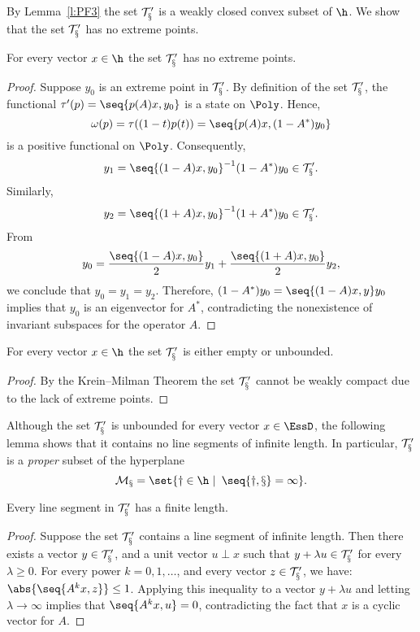 \medskip

By Lemma~\ref{l:PF3} the set $\cal{T}'_x$ is a weakly closed
convex subset of $\h$. We show that the set $\cal{T}'_x$ has no
extreme points.

\smallskip

\begin{lem} \label{l:EXTR}
For every vector $x\in\h$ the set $\cal{T}'_x$ has no extreme
points.
\end{lem}

\begin{proof}
Suppose $y_0$ is an extreme point in $\cal{T}'_x$. By
definition of the set $\cal{T}'_x$, the functional
$\tau'(p)=\seq{p(A)x,y_0}$ is a state on $\Poly$. Hence,
\[ \omega(p)=\tau((1-t)p(t))=\seq{p(A)x, (1-A^*)y_0} \]
is a positive functional on $\Poly$. Consequently,
\[ y_1 = \seq{(1-A)x, y_0}^{-1}(1-A^*)y_0 \in \cal{T}'_x. \]
Similarly,
\[ y_2 = \seq{(1+A)x, y_0}^{-1}(1+A^*)y_0 \in \cal{T}'_x. \]
From
\[ y_0 = \frac{\seq{(1-A)x, y_0}}{2} y_1 +
         \frac{\seq{(1+A)x, y_0}}{2} y_2, \]
we conclude that $y_0=y_1=y_2$. Therefore,
$(1-A^*)y_0=\seq{(1-A)x,y}y_0$ implies that $y_0$ is an
eigenvector for $A^*$, contradicting the nonexistence of
invariant subspaces for the operator $A$.
\end{proof}

\begin{cor} \label{c:UNBOUND}
For every vector $x\in\h$ the set $\cal{T}'_x$ is either empty
or unbounded.
\end{cor}

\begin{proof}
By the Krein--Milman Theorem the set $\cal{T}'_x$ cannot be
weakly compact due to the lack of extreme points.
\end{proof}

\medskip

Although the set $\cal{T}'_x$ is unbounded for every vector
$x\in\EssD$, the following lemma shows that it contains no line
segments of infinite length. In particular, $\cal{T}'_x$ is a
\emph{proper} subset of the hyperplane
\[ \cal{M}_x=\set{y\in\h\,\,|\,\,\,\seq{y,x}=1}. \]

\medskip

\begin{lem} \label{l:FL}
Every line segment in $\cal{T}'_x$ has a finite length.
\end{lem}

\begin{proof}
Suppose the set $\cal{T}'_x$ contains a line segment of
infinite length. Then there exists a vector $y\in\cal{T}'_x$,
and a unit vector $u\perp{x}$ such that $y+\lambda
u\in\cal{T}'_x$ for every $\lambda\geq0$. For every power
$k=0,1,\ldots$, and every vector $z\in\cal{T}'_x$, we have:
$\abs{\seq{A^k x,z}}\leq1$. Applying this inequality to a
vector $y+\lambda u$ and letting $\lambda\to\infty$ implies
that $\seq{A^k x,u}=0$, contradicting the fact that $x$ is a
cyclic vector for $A$.
\end{proof}


